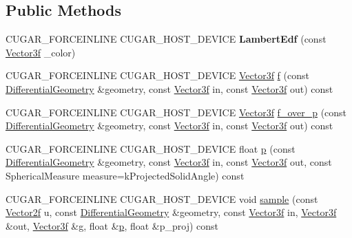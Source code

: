 \subsection*{Public Methods}
\begin{DoxyCompactItemize}
\item 
\mbox{\label{structcugar_1_1_lambert_edf_aed8c1031d0470a4885de9e2d73d6b3a6}} 
C\+U\+G\+A\+R\+\_\+\+F\+O\+R\+C\+E\+I\+N\+L\+I\+NE C\+U\+G\+A\+R\+\_\+\+H\+O\+S\+T\+\_\+\+D\+E\+V\+I\+CE {\bfseries Lambert\+Edf} (const \hyperlink{structcugar_1_1_vector}{Vector3f} \+\_\+color)
\item 
C\+U\+G\+A\+R\+\_\+\+F\+O\+R\+C\+E\+I\+N\+L\+I\+NE C\+U\+G\+A\+R\+\_\+\+H\+O\+S\+T\+\_\+\+D\+E\+V\+I\+CE \hyperlink{structcugar_1_1_vector}{Vector3f} \hyperlink{structcugar_1_1_lambert_edf_aed2fed71aa6a7ad98e05714a0fd5f316}{f} (const \hyperlink{structcugar_1_1_differential_geometry}{Differential\+Geometry} \&geometry, const \hyperlink{structcugar_1_1_vector}{Vector3f} in, const \hyperlink{structcugar_1_1_vector}{Vector3f} out) const
\item 
C\+U\+G\+A\+R\+\_\+\+F\+O\+R\+C\+E\+I\+N\+L\+I\+NE C\+U\+G\+A\+R\+\_\+\+H\+O\+S\+T\+\_\+\+D\+E\+V\+I\+CE \hyperlink{structcugar_1_1_vector}{Vector3f} \hyperlink{structcugar_1_1_lambert_edf_a22dec6f632492c998702dc6f1f4c62c0}{f\+\_\+over\+\_\+p} (const \hyperlink{structcugar_1_1_differential_geometry}{Differential\+Geometry} \&geometry, const \hyperlink{structcugar_1_1_vector}{Vector3f} in, const \hyperlink{structcugar_1_1_vector}{Vector3f} out) const
\item 
C\+U\+G\+A\+R\+\_\+\+F\+O\+R\+C\+E\+I\+N\+L\+I\+NE C\+U\+G\+A\+R\+\_\+\+H\+O\+S\+T\+\_\+\+D\+E\+V\+I\+CE float \hyperlink{structcugar_1_1_lambert_edf_a388560f22fa74fe55678388ea0ae7f69}{p} (const \hyperlink{structcugar_1_1_differential_geometry}{Differential\+Geometry} \&geometry, const \hyperlink{structcugar_1_1_vector}{Vector3f} in, const \hyperlink{structcugar_1_1_vector}{Vector3f} out, const Spherical\+Measure measure=k\+Projected\+Solid\+Angle) const
\item 
C\+U\+G\+A\+R\+\_\+\+F\+O\+R\+C\+E\+I\+N\+L\+I\+NE C\+U\+G\+A\+R\+\_\+\+H\+O\+S\+T\+\_\+\+D\+E\+V\+I\+CE void \hyperlink{structcugar_1_1_lambert_edf_ae860824e138c2d39c17e2d8d7bac5557}{sample} (const \hyperlink{structcugar_1_1_vector}{Vector2f} u, const \hyperlink{structcugar_1_1_differential_geometry}{Differential\+Geometry} \&geometry, const \hyperlink{structcugar_1_1_vector}{Vector3f} in, \hyperlink{structcugar_1_1_vector}{Vector3f} \&out, \hyperlink{structcugar_1_1_vector}{Vector3f} \&g, float \&\hyperlink{structcugar_1_1_lambert_edf_a388560f22fa74fe55678388ea0ae7f69}{p}, float \&p\+\_\+proj) const

\end{DoxyCompactItemize}
